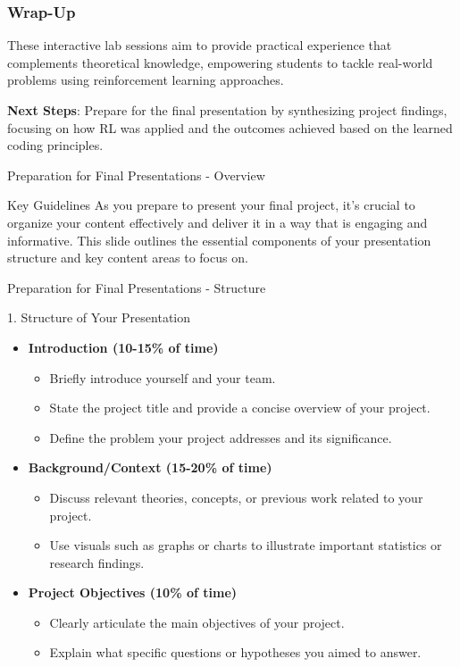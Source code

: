 \documentclass[aspectratio=169]{beamer}
\begin{document}
\begin{frame}[fragile]
    \frametitle{Wrap-Up}
    These interactive lab sessions aim to provide practical experience that complements theoretical 
    knowledge, empowering students to tackle real-world problems using reinforcement learning approaches.
    
    \textbf{Next Steps}: Prepare for the final presentation by synthesizing project findings, focusing on how RL was applied and the outcomes achieved based on the learned coding principles.
\end{frame}

\begin{frame}[fragile]{Preparation for Final Presentations - Overview}
    \begin{block}{Key Guidelines}
        As you prepare to present your final project, it's crucial to organize your content effectively and deliver it in a way that is engaging and informative. This slide outlines the essential components of your presentation structure and key content areas to focus on.
    \end{block}
\end{frame}

\begin{frame}[fragile]{Preparation for Final Presentations - Structure}
    \begin{block}{1. Structure of Your Presentation}
        \begin{itemize}
            \item \textbf{Introduction (10-15\% of time)}
            \begin{itemize}
                \item Briefly introduce yourself and your team.
                \item State the project title and provide a concise overview of your project.
                \item Define the problem your project addresses and its significance.
            \end{itemize}
            \item \textbf{Background/Context (15-20\% of time)}
            \begin{itemize}
                \item Discuss relevant theories, concepts, or previous work related to your project.
                \item Use visuals such as graphs or charts to illustrate important statistics or research findings.
            \end{itemize}
            \item \textbf{Project Objectives (10\% of time)}
            \begin{itemize}
                \item Clearly articulate the main objectives of your project.
                \item Explain what specific questions or hypotheses you aimed to answer.
            \end{itemize}
        \end{itemize}
    \end{block}
\end{frame}
\end{document}
